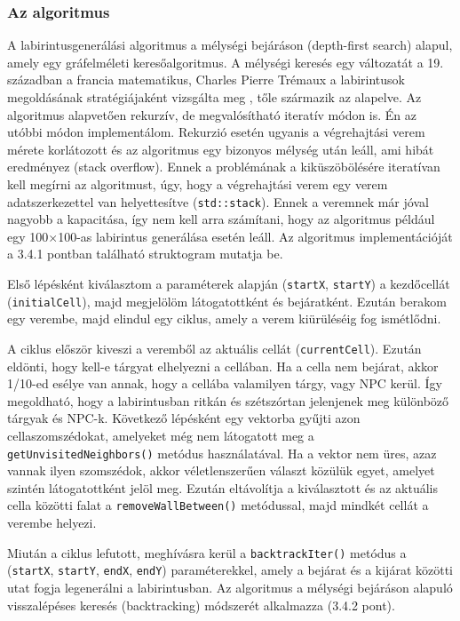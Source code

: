 \subsubsection{Az algoritmus}

A labirintusgenerálási algoritmus a mélységi bejáráson (depth-first search) alapul, amely egy gráfelméleti keresőalgoritmus. A mélységi keresés egy változatát a 19. században a francia matematikus, Charles Pierre Trémaux a labirintusok megoldásának stratégiájaként vizsgálta meg \cite{dfs}, tőle származik az alapelve. Az algoritmus alapvetően rekurzív, de megvalósítható iteratív módon is. Én az utóbbi módon implementálom. Rekurzió esetén ugyanis a végrehajtási verem mérete korlátozott és az algoritmus egy bizonyos mélység után leáll, ami hibát eredményez (stack overflow). Ennek a problémának a kiküszöbölésére iteratívan kell megírni az algoritmust, úgy, hogy a végrehajtási verem egy verem adatszerkezettel van helyettesítve (\verb|std::stack|). Ennek a veremnek már jóval nagyobb a kapacitása, így nem kell arra számítani, hogy az algoritmus például egy 100$\times$100-as labirintus generálása esetén leáll. Az algoritmus implementációját a 3.4.1 pontban található struktogram mutatja be.

Első lépésként kiválasztom a paraméterek alapján (\verb|startX|, \verb|startY|) a kezdőcellát (\verb|initialCell|), majd megjelölöm látogatottként és bejáratként. Ezután berakom egy verembe, majd elindul egy ciklus, amely a verem kiürüléséig fog ismétlődni.

A ciklus először kiveszi a veremből az aktuális cellát (\verb|currentCell|). Ezután eldönti, hogy kell-e tárgyat elhelyezni a cellában. Ha a cella nem bejárat, akkor 1/10-ed esélye van annak, hogy a cellába valamilyen tárgy, vagy NPC kerül. Így megoldható, hogy a labirintusban ritkán és szétszórtan jelenjenek meg különböző tárgyak és NPC-k. Következő lépésként egy vektorba gyűjti azon cellaszomszédokat, amelyeket még nem látogatott meg a \verb|getUnvisitedNeighbors()| metódus használatával. Ha a vektor nem üres, azaz vannak ilyen szomszédok, akkor véletlenszerűen választ közülük egyet, amelyet szintén látogatottként jelöl meg. Ezután eltávolítja a kiválasztott és az aktuális cella közötti falat a \verb|removeWallBetween()| metódussal, majd mindkét cellát a verembe helyezi.

Miután a ciklus lefutott, meghívásra kerül a \verb|backtrackIter()| metódus a (\verb|startX|, \verb|startY|, \verb|endX|, \verb|endY|) paraméterekkel, amely a bejárat és a kijárat közötti utat fogja legenerálni a labirintusban. Az algoritmus a mélységi bejáráson alapuló visszalépéses keresés (backtracking) \cite{backtracking} módszerét alkalmazza (3.4.2 pont).

